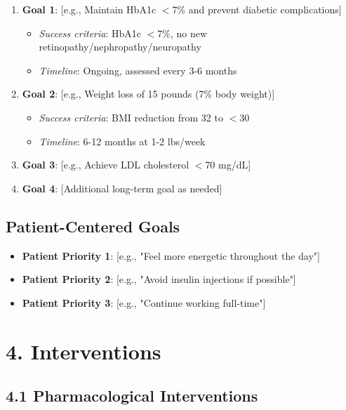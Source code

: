\documentclass[11pt,letterpaper]{article}
\begin{document}
\begin{enumerate}[leftmargin=*]
    \item \textbf{Goal 1}: [e.g., Maintain HbA1c $<$7\% and prevent diabetic complications]
    \begin{itemize}
        \item \textit{Success criteria}: HbA1c $<$7\%, no new retinopathy/nephropathy/neuropathy
        \item \textit{Timeline}: Ongoing, assessed every 3-6 months
    \end{itemize}

    \item \textbf{Goal 2}: [e.g., Weight loss of 15 pounds (7\% body weight)]
    \begin{itemize}
        \item \textit{Success criteria}: BMI reduction from 32 to $<$30
        \item \textit{Timeline}: 6-12 months at 1-2 lbs/week
    \end{itemize}

    \item \textbf{Goal 3}: [e.g., Achieve LDL cholesterol $<$70 mg/dL]

    \item \textbf{Goal 4}: [Additional long-term goal as needed]
\end{enumerate}

\subsection*{Patient-Centered Goals}
\begin{itemize}[leftmargin=*]
    \item \textbf{Patient Priority 1}: [e.g., "Feel more energetic throughout the day"]
    \item \textbf{Patient Priority 2}: [e.g., "Avoid insulin injections if possible"]
    \item \textbf{Patient Priority 3}: [e.g., "Continue working full-time"]
\end{itemize}

\section*{4. Interventions}

\subsection*{4.1 Pharmacological Interventions}
\end{document}
